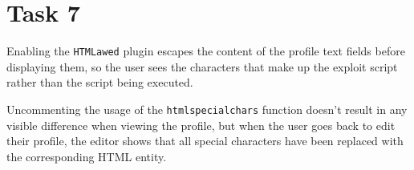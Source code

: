 \documentclass[12pt,letterpaper]{article}
\begin{document}
		
	
	\section*{Task 7}
		Enabling the \texttt{HTMLawed} plugin escapes the content of the profile text fields before displaying them, so the user sees the characters that make up the exploit script rather than the script being executed.
		
		Uncommenting the usage of the \texttt{htmlspecialchars} function doesn't result in any visible difference when viewing the profile, but when the user goes back to edit their profile, the editor shows that all special characters have been replaced with the corresponding HTML entity.
		
\end{document}
